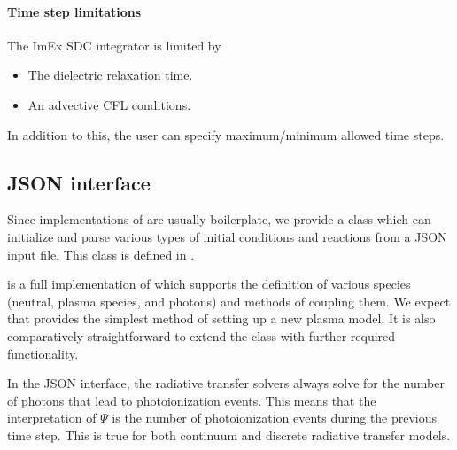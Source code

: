 \documentclass[letterpaper,10pt,english]{sphinxmanual}
\begin{document}
\paragraph{Time step limitations}
\label{\detokenize{Applications/CdrPlasmaModel:id2}}
\sphinxAtStartPar
The ImEx SDC integrator is limited by
\begin{itemize}
\item {} 
\sphinxAtStartPar
The dielectric relaxation time.

\item {} 
\sphinxAtStartPar
An advective CFL conditions.

\end{itemize}

\sphinxAtStartPar
In addition to this, the user can specify maximum/minimum allowed time steps.


\subsection{JSON interface}
\label{\detokenize{Applications/CdrPlasmaModel:json-interface}}\label{\detokenize{Applications/CdrPlasmaModel:chap-cdrplasmajson}}
\sphinxAtStartPar
Since implementations of {\hyperref[\detokenize{Applications/CdrPlasmaModel:chap-cdrplasmaphysics}]{}} are usually boilerplate, we provide a class  which can initialize and parse various types of initial conditions and reactions from a JSON input file.
This class is defined in .

\sphinxAtStartPar
{} is a full implementation of  which supports the definition of various species (neutral, plasma species, and photons) and methods of coupling them.
We expect that  provides the simplest method of setting up a new plasma model.
It is also comparatively straightforward to extend the class with further required functionality.

\sphinxAtStartPar
In the JSON interface, the radiative transfer solvers always solve for the number of photons that lead to photoionization events.
This means that the interpretation of \(\Psi\) is the number of photoionization events during the previous time step.
This is true for both continuum and discrete radiative transfer models.
\end{document}
